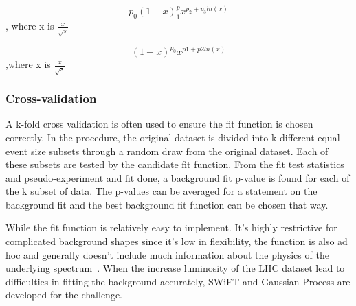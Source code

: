     \begin{equation}
        p_{0}(1-x)^p_{1}x^{p_{2}+p_{3}ln(x)}
        \end{equation}, where x is $\frac{x}{\sqrt{s}}$ ~\cite{2009}

    \begin{equation}
        (1-x)^{p_{0}}x^{p1+p2ln(x)}
    \end{equation},where x is $\frac{x}{\sqrt{s}}$~\cite{2014}

\subsubsection{Cross-validation}
    A k-fold cross validation is often used to ensure the fit function is chosen correctly. In the procedure, the original dataset is divided into k different equal event size subsets through a random draw from the original dataset. Each of these subsets are tested by the candidate fit function. From the fit test statistics and pseudo-experiment and fit done, a background fit p-value is found for each of the k subset of data. The p-values can be averaged for a statement on the background fit and the best background fit function can be chosen that way. 

    While the fit function is relatively easy to implement. It's highly restrictive for complicated background shapes since it's low in flexibility, the function is also ad hoc and generally doesn't include much information about the physics of the underlying spectrum~\cite{ATL-PHYS-PUB-2020-028}. When the increase luminosity of the LHC dataset lead to difficulties in fitting the background accurately, SWiFT and Gaussian Process are developed for the challenge. 

